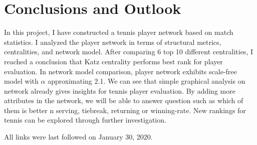 \documentclass[runningheads]{llncs}
\begin{document}
\section{Conclusions and Outlook}

In this project, I have constructed a tennis player network based on match statistics. I analyzed the player network in terms of structural metrics, centralities, and network model. After comparing 6 top 10 different centralities, I reached a conclusion that Katz centrality performs best rank for player evaluation. In network model comparison,  player network exhibits scale-free model with \(\alpha\) approximating 2.1. 
We can see that simple graphical analysis on network already gives insights for tennis player evaluation. By adding more attributes in the network, we will be able to answer question such as which of them is better n serving, tiebreak, returning or winning-rate. New rankings for tennis can be explored through further investigation.
%
%


All links were last followed on January 30, 2020.
\end{document}
